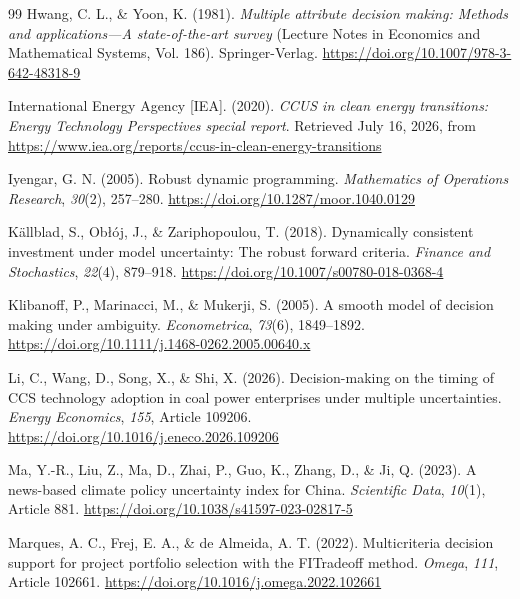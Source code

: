 \begin{thebibliography}{99}
Hwang, C. L., \& Yoon, K. (1981). \emph{Multiple attribute decision making: Methods and applications---A state-of-the-art survey} (Lecture Notes in Economics and Mathematical Systems, Vol. 186). Springer-Verlag. \url{https://doi.org/10.1007/978-3-642-48318-9}

International Energy Agency [IEA]. (2020). \emph{CCUS in clean energy transitions: Energy Technology Perspectives special report}. Retrieved July 16, 2026, from \url{https://www.iea.org/reports/ccus-in-clean-energy-transitions}

Iyengar, G. N. (2005). Robust dynamic programming. \emph{Mathematics of Operations Research}, \emph{30}(2), 257--280. \url{https://doi.org/10.1287/moor.1040.0129}

K\"allblad, S., Ob\l{}\'oj, J., \& Zariphopoulou, T. (2018). Dynamically consistent investment under model uncertainty: The robust forward criteria. \emph{Finance and Stochastics}, \emph{22}(4), 879--918. \url{https://doi.org/10.1007/s00780-018-0368-4}

Klibanoff, P., Marinacci, M., \& Mukerji, S. (2005). A smooth model of decision making under ambiguity. \emph{Econometrica}, \emph{73}(6), 1849--1892. \url{https://doi.org/10.1111/j.1468-0262.2005.00640.x}

Li, C., Wang, D., Song, X., \& Shi, X. (2026). Decision-making on the timing of CCS technology adoption in coal power enterprises under multiple uncertainties. \emph{Energy Economics}, \emph{155}, Article 109206. \url{https://doi.org/10.1016/j.eneco.2026.109206}

Ma, Y.-R., Liu, Z., Ma, D., Zhai, P., Guo, K., Zhang, D., \& Ji, Q. (2023). A news-based climate policy uncertainty index for China. \emph{Scientific Data}, \emph{10}(1), Article 881. \url{https://doi.org/10.1038/s41597-023-02817-5}

Marques, A. C., Frej, E. A., \& de Almeida, A. T. (2022). Multicriteria decision support for project portfolio selection with the FITradeoff method. \emph{Omega}, \emph{111}, Article 102661. \url{https://doi.org/10.1016/j.omega.2022.102661}


\end{thebibliography}
